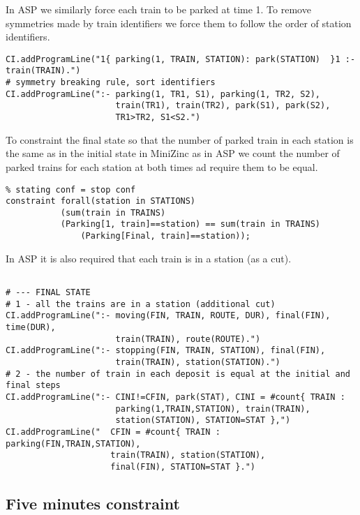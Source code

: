 \documentclass[11pt]{article}
\begin{document}
In ASP we similarly force each train to be parked at time 1. To remove
symmetries made by train identifiers we force them to follow the order of
station identifiers.

\begin{verbatim}
CI.addProgramLine("1{ parking(1, TRAIN, STATION): park(STATION)  }1 :- train(TRAIN).")
# symmetry breaking rule, sort identifiers
CI.addProgramLine(":- parking(1, TR1, S1), parking(1, TR2, S2), 
                      train(TR1), train(TR2), park(S1), park(S2),
                      TR1>TR2, S1<S2.")
\end{verbatim}

To constraint the final state so that the number of 
parked train in each station is the same 
as in the initial state in MiniZinc as in ASP we count
the number of parked trains for each
station at both times ad require them to be equal.  

\begin{verbatim}
% stating conf = stop conf
constraint forall(station in STATIONS)
           (sum(train in TRAINS)
           (Parking[1, train]==station) == sum(train in TRAINS)
               (Parking[Final, train]==station));                         
\end{verbatim}

In ASP it is also required that each train is in a station (as a cut).

\begin{verbatim}

# --- FINAL STATE
# 1 - all the trains are in a station (additional cut)
CI.addProgramLine(":- moving(FIN, TRAIN, ROUTE, DUR), final(FIN), time(DUR),
                      train(TRAIN), route(ROUTE).")
CI.addProgramLine(":- stopping(FIN, TRAIN, STATION), final(FIN),
                      train(TRAIN), station(STATION).")
# 2 - the number of train in each deposit is equal at the initial and final steps
CI.addProgramLine(":- CINI!=CFIN, park(STAT), CINI = #count{ TRAIN :
                      parking(1,TRAIN,STATION), train(TRAIN), 
                      station(STATION), STATION=STAT },")
CI.addProgramLine("  CFIN = #count{ TRAIN : parking(FIN,TRAIN,STATION), 
                     train(TRAIN), station(STATION), 
                     final(FIN), STATION=STAT }.")
\end{verbatim}


\subsection{Five minutes constraint}
\end{document}
